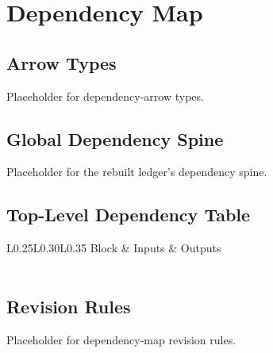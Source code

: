 \chapter{Dependency Map}
\label{chap:dependency-map}


\section{Arrow Types}
\label{sec:dependency-arrow-types}

Placeholder for dependency-arrow types.

\section{Global Dependency Spine}
\label{sec:global-dependency-spine}

Placeholder for the rebuilt ledger's dependency spine.

\section{Top-Level Dependency Table}
\label{sec:top-level-dependency-table}

\begin{longtable}{L{0.25\textwidth}L{0.30\textwidth}L{0.35\textwidth}}
\toprule
Block & Inputs & Outputs \\
\midrule
\endhead
{} \\
\bottomrule
\end{longtable}

\section{Revision Rules}
\label{sec:dependency-revision-rules}

Placeholder for dependency-map revision rules.
